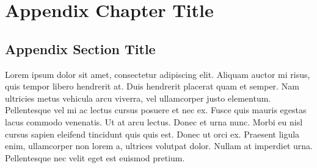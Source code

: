 \documentclass[
	11pt, %
	fleqn, %
	a4paper, %
]{LegrandOrangeBook}
\begin{document}

\chapter{Appendix Chapter Title}

\section{Appendix Section Title}

Lorem ipsum dolor sit amet, consectetur adipiscing elit. Aliquam auctor mi risus, quis tempor libero hendrerit at. Duis hendrerit placerat quam et semper. Nam ultricies metus vehicula arcu viverra, vel ullamcorper justo elementum. Pellentesque vel mi ac lectus cursus posuere et nec ex. Fusce quis mauris egestas lacus commodo venenatis. Ut at arcu lectus. Donec et urna nunc. Morbi eu nisl cursus sapien eleifend tincidunt quis quis est. Donec ut orci ex. Praesent ligula enim, ullamcorper non lorem a, ultrices volutpat dolor. Nullam at imperdiet urna. Pellentesque nec velit eget est euismod pretium.


\end{document}
